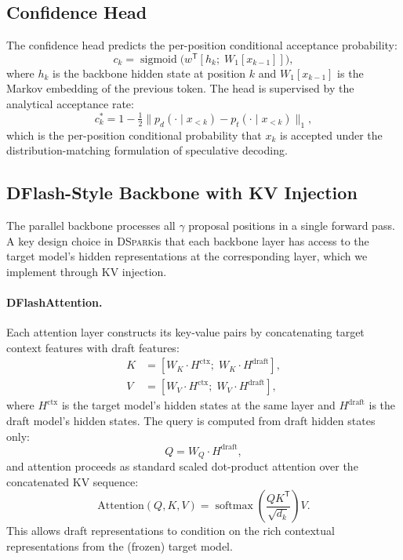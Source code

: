 \documentclass[11pt,a4paper]{article}
\newcommand{\DSpark}{\textsc{DSpark}}
\DeclareMathOperator{\softmax}{softmax}
\DeclareMathOperator{\sigmoid}{sigmoid}
\begin{document}
\subsection{Confidence Head}

The confidence head predicts the per-position conditional acceptance
probability:
\begin{equation}
  c_k = \sigmoid\bigl(w^{\mathsf{T}} [h_k ;\; W_1[x_{k-1}]]\bigr),
\end{equation}
where $h_k$ is the backbone hidden state at position $k$ and $W_1[x_{k-1}]$
is the Markov embedding of the previous token. The head is supervised by the
analytical acceptance rate:
\begin{equation}
  c_k^* = 1 - \tfrac12 \|p_d(\cdot \mid x_{<k}) - p_t(\cdot \mid x_{<k})\|_1,
\end{equation}
which is the per-position conditional probability that $x_k$ is accepted
under the distribution-matching formulation of speculative decoding.

\subsection{DFlash-Style Backbone with KV Injection}
\label{subsec:backbone}

The parallel backbone processes all $\gamma$ proposal positions in a single
forward pass. A key design choice in \DSpark is that each backbone layer
has access to the target model's hidden representations at the corresponding
layer, which we implement through KV injection.

\paragraph{DFlashAttention.}
Each attention layer constructs its key-value pairs by concatenating target
context features with draft features:
\begin{align}
  K &= [W_K \cdot H^\text{ctx} ;\; W_K \cdot H^\text{draft}], \\
  V &= [W_V \cdot H^\text{ctx} ;\; W_V \cdot H^\text{draft}],
\end{align}
where $H^\text{ctx}$ is the target model's hidden states at the same layer
and $H^\text{draft}$ is the draft model's hidden states. The query is
computed from draft hidden states only:
\begin{equation}
  Q = W_Q \cdot H^\text{draft},
\end{equation}
and attention proceeds as standard scaled dot-product attention over the
concatenated KV sequence:
\begin{equation}
  \text{Attention}(Q, K, V) = \softmax\left(\frac{Q K^{\mathsf{T}}}{\sqrt{d_k}}\right) V.
\end{equation}
This allows draft representations to condition on the rich contextual
representations from the (frozen) target model.
\end{document}
